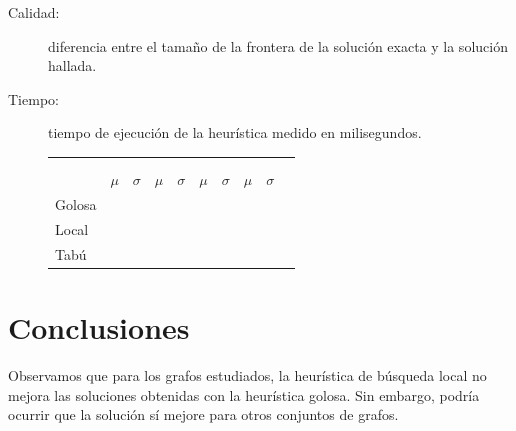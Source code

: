 \documentclass[a4paper, 10pt, twoside]{article}
\begin{document}
\begin{description}
	\item[Calidad:] diferencia entre el tamaño de la frontera de la solución exacta y la solución hallada. 
	\item[Tiempo:] tiempo de ejecución de la heurística medido en milisegundos.
\end{description}



\begin{figure}[H]
	\begin{tabularx}{\textwidth}{ |>{\small}X| *9{ >{\small\centering}X|} }
		\hline
		 &
		 &
		\tabularnewline
		
		&
		 &
		 &
		 &
		\tabularnewline

		& $\mu$ & $\sigma$ & $\mu$ & $\sigma$ & $\mu$ & $\sigma$ & $\mu$ & $\sigma$
		\tabularnewline

		\hline
		Golosa &
		\golosaentrenamientocalidadmu &
		\golosaentrenamientocalidadsigma &
		\golosaentrenamientotiempomu &
		\golosaentrenamientotiemposigma &
		\golosatestingcalidadmu &
		\golosatestingcalidadsigma &
		\golosatestingtiempomu &
		\golosatestingtiemposigma
		\tabularnewline

		\hline
		Local &
		\localentrenamientocalidadmu &
		\localentrenamientocalidadsigma &
		\localentrenamientotiempomu &
		\localentrenamientotiemposigma &
		\localtestingcalidadmu &
		\localtestingcalidadsigma &
		\localtestingtiempomu &
		\localtestingtiemposigma
		\tabularnewline

		\hline
		Tabú &
		\tabuentrenamientocalidadmu &
		\tabuentrenamientocalidadsigma &
		\tabuentrenamientotiempomu &
		\tabuentrenamientotiemposigma &
		\tabutestingcalidadmu &
		\tabutestingcalidadsigma &
		\tabutestingtiempomu &
		\tabutestingtiemposigma
		\tabularnewline

		\hline
	\end{tabularx}
\end{figure}


\section{Conclusiones}

Observamos que para los grafos estudiados, la heurística de búsqueda local no mejora las soluciones obtenidas con la heurística golosa. Sin embargo, podría ocurrir que la solución sí mejore para otros conjuntos de grafos.
\end{document}
